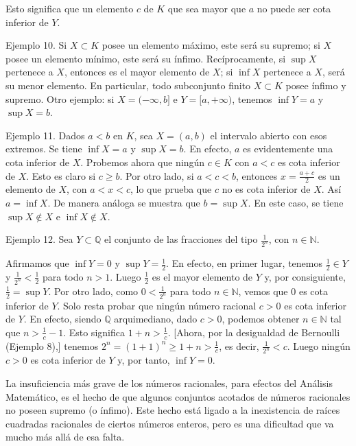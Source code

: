 \documentclass[12pt,oneside]{book}
\begin{document}
Esto significa que un elemento \( c \) de \( K \) que sea mayor que \( a \) no puede ser cota inferior de \( Y \).

Ejemplo 10. Si \( X \subset K \) posee un elemento máximo, este será su supremo; si \( X \) posee un elemento mínimo, este será su ínfimo. Recíprocamente, si \( \sup X \) pertenece a \( X \), entonces es el mayor elemento de \( X \); si \( \inf X \) pertenece a \( X \), será su menor elemento. En particular, todo subconjunto finito \( X \subset K \) posee ínfimo y supremo. Otro ejemplo: si \( X = (-\infty, b] \) e \( Y = [a, +\infty) \), tenemos \( \inf Y = a \) y \( \sup X = b \).

Ejemplo 11. Dados \( a < b \) en \( K \), sea \( X = (a, b) \) el intervalo abierto con esos extremos. Se tiene \( \inf X = a \) y \( \sup X = b \). En efecto, \( a \) es evidentemente una cota inferior de \( X \). Probemos ahora que ningún \( c \in K \) con \( a < c \) es cota inferior de \( X \). Esto es claro si \( c \geq b \). Por otro lado, si \( a < c < b \), entonces \( x = \frac{a + c}{2} \) es un elemento de \( X \), con \( a < x < c \), lo que prueba que \( c \) no es cota inferior de \( X \). Así \( a = \inf X \). De manera análoga se muestra que \( b = \sup X \). En este caso, se tiene \( \sup X \notin X \) e \( \inf X \notin X \).

Ejemplo 12. Sea \( Y \subset \mathbb{Q} \) el conjunto de las fracciones del tipo \( \frac{1}{2^n} \), con \( n \in \mathbb{N} \).

Afirmamos que \( \inf Y = 0 \) y \( \sup Y = \frac{1}{2} \). En efecto, en primer lugar, tenemos \( \frac{1}{2} \in Y \) y \( \frac{1}{2^n} < \frac{1}{2} \) para todo \( n > 1 \). Luego \( \frac{1}{2} \) es el mayor elemento de \( Y \) y, por consiguiente, \( \frac{1}{2} = \sup Y \). Por otro lado, como \( 0 < \frac{1}{2^n} \) para todo \( n \in \mathbb{N} \), vemos que \( 0 \) es cota inferior de \( Y \). Solo resta probar que ningún número racional \( c > 0 \) es cota inferior de \( Y \). En efecto, siendo \( \mathbb{Q} \) arquimediano, dado \( c > 0 \), podemos obtener \( n \in \mathbb{N} \) tal que \( n > \frac{1}{c} - 1 \). Esto significa \( 1 + n > \frac{1}{c} \). [Ahora, por la desigualdad de Bernoulli (Ejemplo 8),] tenemos \( 2^n = (1+1)^n \geq 1 + n > \frac{1}{c} \), es decir, \( \frac{1}{2^n} < c \). Luego
ningún \( c > 0 \) es cota inferior de \( Y \) y, por tanto, \( \inf Y = 0 \).

La insuficiencia más grave de los números racionales, para efectos del Análisis Matemático, es el hecho de que algunos conjuntos acotados de números racionales no poseen supremo (o ínfimo). Este hecho está ligado a la inexistencia de raíces cuadradas racionales de ciertos números enteros, pero es una dificultad que va mucho más allá de esa falta.
\end{document}
